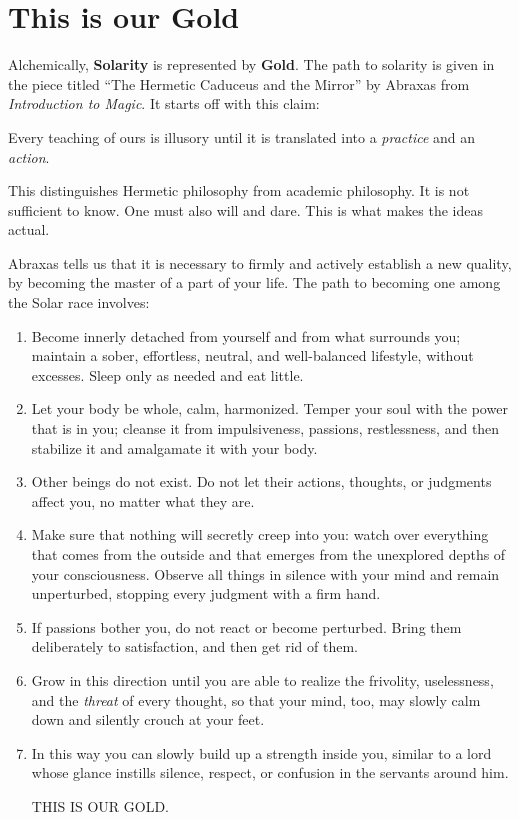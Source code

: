 \section{This is our Gold}

Alchemically, \textbf{Solarity} is represented by \textbf{Gold}. The path to solarity is given in the piece titled ``The Hermetic Caduceus and the Mirror'' by Abraxas from \emph{Introduction to Magic}. It starts off with this claim:

\begin{quotex}
Every teaching of ours is illusory until it is translated into a \emph{practice} and an \emph{action}.
\end{quotex}


This distinguishes Hermetic philosophy from academic philosophy. It is not sufficient to know. One must also will and dare. This is what makes the ideas actual.

Abraxas tells us that it is necessary to firmly and actively establish a new quality, by becoming the master of a part of your life. The path to becoming one among the Solar race involves:

\begin{enumerate}


\item Become innerly detached from yourself and from what surrounds you; maintain a sober, effortless, neutral, and well-balanced lifestyle, without excesses. Sleep only as needed and eat little.

\item Let your body be whole, calm, harmonized. Temper your soul with the power that is in you; cleanse it from impulsiveness, passions, restlessness, and then stabilize it and amalgamate it with your body.

\item Other beings do not exist. Do not let their actions, thoughts, or judgments affect you, no matter what they are.

\item Make sure that nothing will secretly creep into you: watch over everything that comes from the outside and that emerges from the unexplored depths of your consciousness. Observe all things in silence with your mind and remain unperturbed, stopping every judgment with a firm hand.

\item If passions bother you, do not react or become perturbed. Bring them deliberately to satisfaction, and then get rid of them.

\item Grow in this direction until you are able to realize the frivolity, uselessness, and the \emph{threat} of every thought, so that your mind, too, may slowly calm down and silently crouch at your feet.

\item In this way you can slowly build up a strength inside you, similar to a lord whose glance instills silence, respect, or confusion in the servants around him.

THIS IS OUR GOLD.
\end{enumerate}



